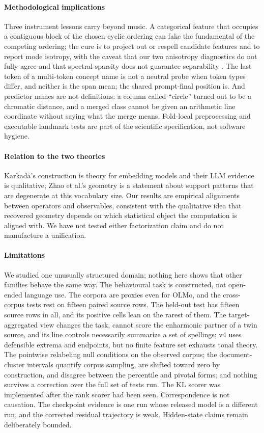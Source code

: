 \documentclass[11pt]{article}
\begin{document}
\paragraph{Methodological implications} Three instrument lessons carry beyond music. A categorical feature that occupies a contiguous block of the chosen cyclic ordering can fake the fundamental of the competing ordering; the cure is to project out or respell candidate features and to report mode isotropy, with the caveat that our two anisotropy diagnostics do not fully agree and that spectral sparsity does not guarantee separability \citep{fu2026convergent}. The last token of a multi-token concept name is not a neutral probe when token types differ, and neither is the span mean; the shared prompt-final position is. And predictor names are not definitions: a column called ``circle'' turned out to be a chromatic distance, and a merged class cannot be given an arithmetic line coordinate without saying what the merge means. Fold-local preprocessing and executable landmark tests are part of the scientific specification, not software hygiene.

\paragraph{Relation to the two theories} Karkada's construction is theory for embedding models and their LLM evidence is qualitative; Zhao et al.'s geometry is a statement about support patterns that are degenerate at this vocabulary size. Our results are empirical alignments between operators and observables, consistent with the qualitative idea that recovered geometry depends on which statistical object the computation is aligned with. We have not tested either factorization claim and do not manufacture a unification.

\paragraph{Limitations} We studied one unusually structured domain; nothing here shows that other families behave the same way. The behavioural task is constructed, not open-ended language use. The corpora are proxies even for OLMo, and the cross-corpus tests rest on fifteen paired source rows. The held-out test has fifteen source rows in all, and its positive cells lean on the rarest of them. The target-aggregated view changes the task, cannot score the enharmonic partner of a twin source, and its line controls necessarily summarize a set of spellings; v4 uses defensible extrema and endpoints, but no finite feature set exhausts tonal theory. The pointwise relabeling null conditions on the observed corpus; the document-cluster intervals quantify corpus sampling, are shifted toward zero by construction, and disagree between the percentile and pivotal forms; and nothing survives a correction over the full set of tests run. The KL scorer was implemented after the rank scorer had been seen. Correspondence is not causation. The checkpoint evidence is one run whose released model is a different run, and the corrected residual trajectory is weak. Hidden-state claims remain deliberately bounded.
\end{document}
